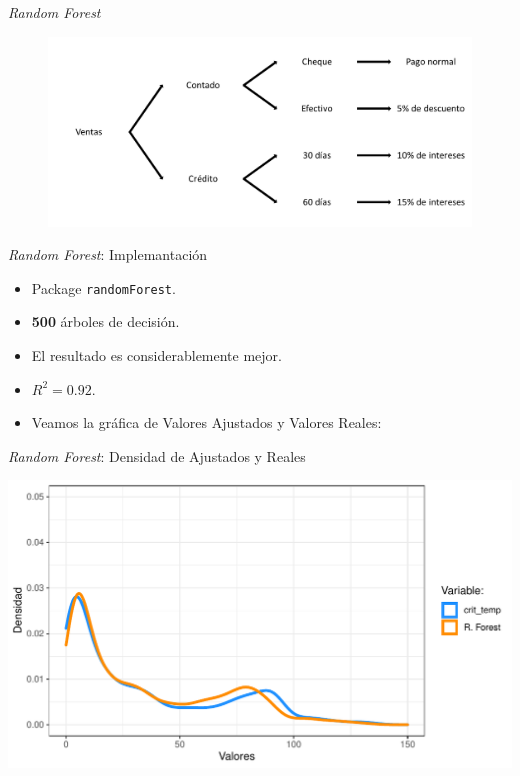 \documentclass[11pt]{beamer}\usepackage{knitr}
\newcommand{\cod}[1]{\texttt{\frenchspacing#1}}
\begin{document}
\begin{frame}{\textit{Random Forest}}
	\begin{figure}
		\includegraphics[scale=0.4]{figures/arbol-de-decisiones.png}
	\end{figure}
\end{frame}

\begin{frame}{\textit{Random Forest}: Implemantación}
	\begin{itemize}
		\item Package \cod{randomForest}.
		\pause
		\item \textbf{500} árboles de decisión.
		\pause
		\item El resultado es considerablemente mejor.
		\pause
		\item $R^2=\mathbf{0.92}$.
		\pause
		\item Veamos la gráfica de Valores Ajustados y Valores Reales:
	\end{itemize}
\end{frame}

\begin{frame}[fragile]{\textit{Random Forest}: Densidad de Ajustados y Reales}

\begin{knitrout}\footnotesize
{}\color{fgcolor}

{\centering \includegraphics[width=\maxwidth]{figure/unnamed-chunk-11-1} 

}



\end{knitrout}


	\end{frame}
\end{document}
